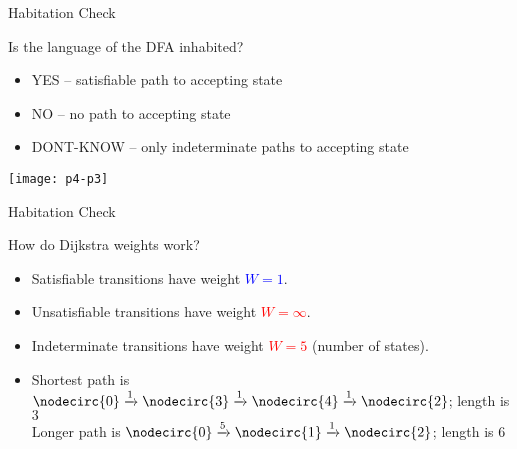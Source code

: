 \begin{frame}{Habitation Check}

  Is the language of the DFA inhabited?
  \begin{itemize}
  \item YES -- satisfiable path to accepting state
  \item NO -- no path to accepting state
  \item DONT-KNOW -- only indeterminate paths to accepting state
  \end{itemize}

  \texttt{[image: p4-p3]}

\end{frame}


\begin{frame}{Habitation Check}

  How do Dijkstra weights work?

  \only<2,3>{\scalebox{0.8}{}}%

  \begin{itemize}
  \item<2->{Satisfiable transitions have weight \textcolor{blue}{$W\!=1$}.}
  \item<3->{Unsatisfiable transitions have weight \textcolor{red}{$W\!=\infty$}.}
  \item<4->{Indeterminate transitions have weight \textcolor{red}{$W\!=5$} (number of states).}
  \item<5>{Shortest path is $\nodecirc{0} \xrightarrow{1} \nodecirc{3} \xrightarrow{1} \nodecirc{4}  \xrightarrow{1} \nodecirc{2}$; length is $3$\\
  Longer path is $\nodecirc{0}\xrightarrow{5}\nodecirc{1}\xrightarrow{1}\nodecirc{2}$; length is $6$}
  \end{itemize}
\end{frame}




